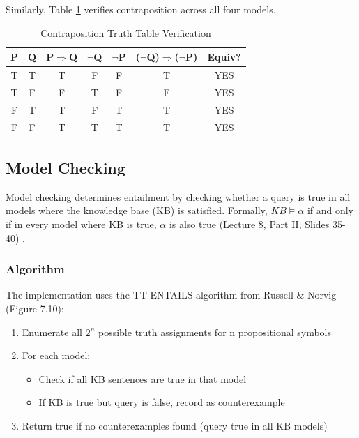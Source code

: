 \documentclass[letterpaper]{article}
\begin{document}
Similarly, Table \ref{tab:contraposition} verifies contraposition across all four models.

\begin{table}[h]
\centering
\caption{Contraposition Truth Table Verification}
\label{tab:contraposition}
\begin{tabular}{cc|ccc|c|c}
\toprule
P & Q & P$\Rightarrow$Q & $\neg$Q & $\neg$P & ($\neg$Q)$\Rightarrow$($\neg$P) & Equiv? \\
\midrule
T & T & T & F & F & T & YES \\
T & F & F & T & F & F & YES \\
F & T & T & F & T & T & YES \\
F & F & T & T & T & T & YES \\
\bottomrule
\end{tabular}
\end{table}

\subsection{Model Checking}

Model checking determines entailment by checking whether a query is true in all models where the knowledge base (KB) is satisfied. Formally, $KB \models \alpha$ if and only if in every model where KB is true, $\alpha$ is also true (Lecture 8, Part II, Slides 35-40) \cite{atyabi2025lecture8}.

\subsubsection{Algorithm}

The implementation uses the TT-ENTAILS algorithm from Russell \& Norvig (Figure 7.10):

\begin{enumerate}
\item Enumerate all $2^n$ possible truth assignments for n propositional symbols
\item For each model:
   \begin{itemize}
   \item Check if all KB sentences are true in that model
   \item If KB is true but query is false, record as counterexample
   \end{itemize}
\item Return true if no counterexamples found (query true in all KB models)
\end{enumerate}
\end{document}
